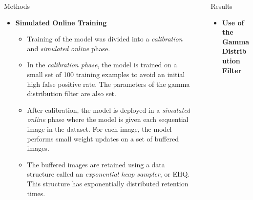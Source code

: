 \documentclass[final,hyperref={pdfpagelabels=false}]{beamer}
\begin{document}
\begin{frame}[t]
\begin{columns}[t]
\begin{column}{.465\textwidth}
\begin{block}{Methods}
\begin{itemize}
\item\textbf{Simulated Online Training}
\begin{itemize}
\item Training of the model was divided into a \textit{calibration} and \textit{simulated online} phase.

\item In the \textit{calibration phase}, the model is trained on a small set of 100 training examples to avoid an initial high false positive rate. The parameters of the gamma distribution filter are also set.

\item After calibration, the model is deployed in a \textit{simulated online} phase where the model is given each sequential image in the dataset. For each image, the model performs small weight updates on a set of buffered images.

\item The buffered images are retained using a data structure called an \textit{exponential heap sampler}, or EHQ. This structure has exponentially distributed retention times.\\[6mm]
\end{itemize}
\end{itemize}


\end{block}


\end{column} %
\begin{column}{.03\textwidth}\end{column} %
 
\begin{column}{.465\textwidth} %



\begin{block}{Results}

\begin{itemize}
\item\textbf{Use of the Gamma Distribution Filter}\\[6mm]


\end{itemize}
\end{block}
\end{column}
\end{columns}
\end{frame}
\end{document}
